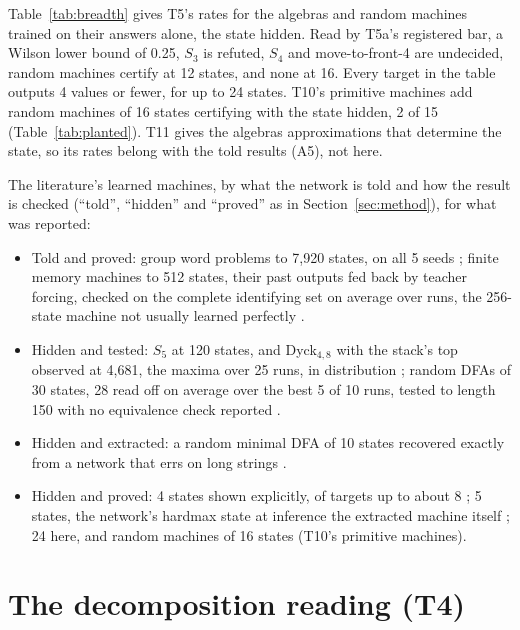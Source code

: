 \documentclass[11pt]{article}
\newcommand{\pn}[2]{#2}
\begin{document}
Table~\ref{tab:breadth} gives T5's rates for the algebras and random machines trained on their
answers alone, the state hidden. Read by T5a's registered bar, a Wilson lower bound of 0.25, $S_3$ is
refuted, $S_4$ and move-to-front-4 are undecided, random machines certify at 12 states, and none at
16. Every target in the table outputs 4 values or fewer, for up to 24 states. T10's primitive machines
add random machines of 16 states certifying with the state hidden, \pn{t10.p0-machines}{2} of
\pn{t10.machines}{15} (Table~\ref{tab:planted}). T11 gives the algebras approximations that
determine the state, so its rates belong with the told results (A5), not here.

The literature's learned machines, by what the network is told and how the result is checked
(``told'', ``hidden'' and ``proved'' as in Section~\ref{sec:method}), for what was reported:
\begin{itemize}
\item Told and proved: group word problems to 7{,}920 states, on all 5 seeds
  \citep{brandoit-2026-length-independent-state-tracking}; finite memory machines to 512 states,
  their past outputs fed back by teacher forcing, checked on the complete identifying set on average
  over runs, the 256-state machine not usually learned perfectly
  \citep{giles-1995-learning-class-large-finite-state-machines}.
\item Hidden and tested: $S_5$ at 120 states, and Dyck$_{4,8}$ with the stack's top observed at
  4{,}681, the maxima over 25 runs, in distribution
  \citep{liu-2022-transformers-shortcuts-automata}; random DFAs of 30 states, 28 read off on
  average over the best 5 of 10 runs, tested to length 150 with no equivalence check reported
  \citep{umili-2024-deepdfa-automata-learning-probabilistic-relaxations}.
\item Hidden and extracted: a random minimal DFA of 10 states recovered exactly from a network that
  errs on long strings \citep{omlin-1996-extraction-rules-discrete-time-rnn}.
\item Hidden and proved: 4 states shown explicitly, of targets up to about 8
  \citep{zeng-1993-self-clustering-recurrent-networks}; 5 states, the network's hardmax state at
  inference the extracted machine itself \citep{aichernig-2024-learning-minimal-automata-rnn}; 24
  here, and random machines of 16 states (T10's primitive machines).
\end{itemize}

\section{The decomposition reading (T4)}
\label{app:decompositions}
\end{document}

